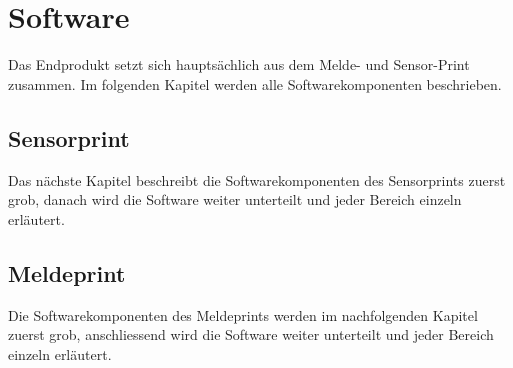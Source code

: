 \section{Software}
Das Endprodukt setzt sich hauptsächlich aus dem Melde- und Sensor-Print zusammen. Im folgenden Kapitel werden alle Softwarekomponenten beschrieben.
\subsection{Sensorprint}
Das nächste Kapitel beschreibt die Softwarekomponenten des Sensorprints zuerst grob, danach wird die Software weiter unterteilt und jeder Bereich einzeln erläutert.
\subsection{Meldeprint}
Die Softwarekomponenten des Meldeprints werden im nachfolgenden Kapitel zuerst grob, anschliessend wird die Software weiter unterteilt und jeder Bereich einzeln erläutert. 
